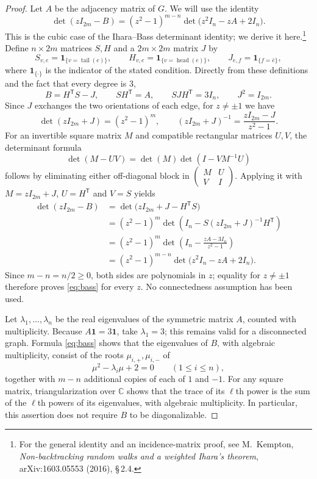 \documentclass[11pt,a4paper]{article}
\DeclareMathOperator{\head}{head}
\DeclareMathOperator{\tail}{tail}
\begin{document}
\begin{proof}
Let $A$ be the adjacency matrix of $G$. We will use the identity
\begin{equation}\label{eq:bass}
  \det(zI_{2m}-B)
  =(z^2-1)^{m-n}\det\bigl(z^2I_n-zA+2I_n\bigr).
\end{equation}
This is the cubic case of the Ihara--Bass determinant identity;
we derive it here.\footnote{For the general identity and an
incidence-matrix proof, see M.~Kempton, \emph{Non-backtracking random walks
and a weighted Ihara's theorem}, arXiv:1603.05553 (2016), \S\,2.4.}
Define $n\times2m$ matrices $S,H$ and a $2m\times2m$ matrix $J$ by
\[
  S_{v,e}=\mathbf1_{\{v=\tail(e)\}},
  \qquad
  H_{v,e}=\mathbf1_{\{v=\head(e)\}},
  \qquad
  J_{e,f}=\mathbf1_{\{f=\bar e\}},
\]
where $\mathbf1_{\{\cdot\}}$ is the indicator of the stated condition.
Directly from these definitions and the fact that every degree is $3$,
\[
  B=H^{\mathsf T}S-J,
  \qquad SH^{\mathsf T}=A,
  \qquad SJH^{\mathsf T}=3I_n,
  \qquad J^2=I_{2m}.
\]
Since $J$ exchanges the two orientations of each edge, for $z\ne\pm1$
we have
\[
  \det(zI_{2m}+J)=(z^2-1)^m,
  \qquad
  (zI_{2m}+J)^{-1}=\frac{zI_{2m}-J}{z^2-1}.
\]
For an invertible square matrix $M$ and compatible rectangular
matrices $U,V$, the determinant formula
\[
  \det(M-UV)=\det(M)\det(I-VM^{-1}U)
\]
follows by eliminating either off-diagonal block in
$\begin{pmatrix}M&U\\V&I\end{pmatrix}$.
Applying it with $M=zI_{2m}+J$, $U=H^{\mathsf T}$ and $V=S$ yields
\begin{align*}
  \det(zI_{2m}-B)
  &=\det\bigl(zI_{2m}+J-H^{\mathsf T}S\bigr)\\
  &=(z^2-1)^m
    \det\!\left(I_n-S(zI_{2m}+J)^{-1}H^{\mathsf T}\right)\\
  &=(z^2-1)^m
    \det\!\left(I_n-\frac{zA-3I_n}{z^2-1}\right)\\
  &=(z^2-1)^{m-n}\det\bigl(z^2I_n-zA+2I_n\bigr).
\end{align*}
Since $m-n=n/2\ge0$, both sides are polynomials in $z$; equality for
$z\ne\pm1$ therefore proves \eqref{eq:bass} for every $z$.
No connectedness assumption has been used.

Let $\lambda_1,\ldots,\lambda_n$ be the real eigenvalues of the
symmetric matrix $A$, counted with multiplicity. Because
$A\mathbf1=3\mathbf1$, take $\lambda_1=3$; this remains valid for a
disconnected graph. Formula \eqref{eq:bass} shows that the eigenvalues
of $B$, with algebraic multiplicity, consist of the roots
$\mu_{i,+},\mu_{i,-}$ of
\[
  \mu^2-\lambda_i\mu+2=0
  \qquad(1\le i\le n),
\]
together with $m-n$ additional copies of each of $1$ and $-1$.
For any square matrix, triangularization over $\mathbb C$ shows that
the trace of its $\ell$th power is the sum of the $\ell$th powers of
its eigenvalues, with algebraic multiplicity. In particular, this
assertion does not require $B$ to be diagonalizable.


\end{proof}
\end{document}
